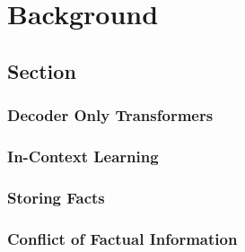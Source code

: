 
\chapter{Background}\label{chapter:background}

\section{Section}

\subsection{Decoder Only Transformers}

\subsection{In-Context Learning}

\subsection{Storing Facts}

\subsection{Conflict of Factual Information}